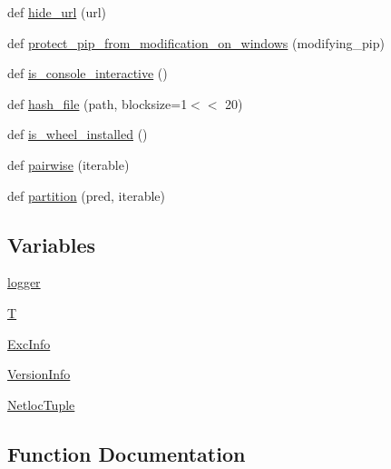 \begin{DoxyCompactItemize}
\item 
def \hyperlink{namespacepip_1_1__internal_1_1utils_1_1misc_ad0bfbf7407ab5668a56454a74546b8ee}{hide\+\_\+url} (url)
\item 
def \hyperlink{namespacepip_1_1__internal_1_1utils_1_1misc_aa77f1326dc7d585fd039d1316ecde3c7}{protect\+\_\+pip\+\_\+from\+\_\+modification\+\_\+on\+\_\+windows} (modifying\+\_\+pip)
\item 
def \hyperlink{namespacepip_1_1__internal_1_1utils_1_1misc_af78c94fde0e81c8c21ca53d223df2f57}{is\+\_\+console\+\_\+interactive} ()
\item 
def \hyperlink{namespacepip_1_1__internal_1_1utils_1_1misc_add5007422603dcbaf73096153ecb3744}{hash\+\_\+file} (path, blocksize=1$<$$<$ 20)
\item 
def \hyperlink{namespacepip_1_1__internal_1_1utils_1_1misc_a4fca7f57530eca04396c53ec9a65b97c}{is\+\_\+wheel\+\_\+installed} ()
\item 
def \hyperlink{namespacepip_1_1__internal_1_1utils_1_1misc_adc48e1cb3474fff341e006d66f83afbb}{pairwise} (iterable)
\item 
def \hyperlink{namespacepip_1_1__internal_1_1utils_1_1misc_ab1bf8a3147c51c323ea4ccb4fbb2156c}{partition} (pred, iterable)
\end{DoxyCompactItemize}
\subsection*{Variables}
\begin{DoxyCompactItemize}
\item 
\hyperlink{namespacepip_1_1__internal_1_1utils_1_1misc_ae056b341885a961b8f9bd71f86a3bdb9}{logger}
\item 
\hyperlink{namespacepip_1_1__internal_1_1utils_1_1misc_a4f84d05af01eeb7281e27ec1748a890b}{T}
\item 
\hyperlink{namespacepip_1_1__internal_1_1utils_1_1misc_a5283942e61824eb907951057408d1c15}{Exc\+Info}
\item 
\hyperlink{namespacepip_1_1__internal_1_1utils_1_1misc_adfa78f5d096205d396f991fe50480896}{Version\+Info}
\item 
\hyperlink{namespacepip_1_1__internal_1_1utils_1_1misc_a185df8b78ba31039081ad4257f74d266}{Netloc\+Tuple}
\end{DoxyCompactItemize}


\subsection{Function Documentation}
\mbox{\label{namespacepip_1_1__internal_1_1utils_1_1misc_a58fde5883882cc9ed5d6187ccb0bf074}} 
